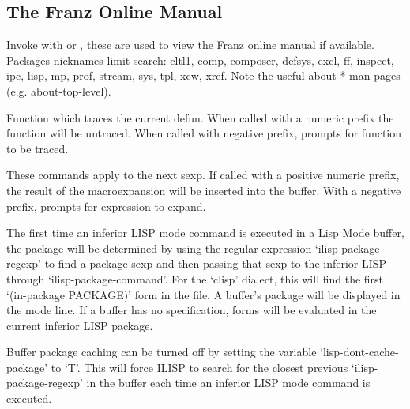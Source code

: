 

\subsection{The Franz Online Manual}

Invoke with  or , these are used to view the
Franz online manual if available.  Packages
nicknames limit search: cltl1, comp, composer, defsys, excl, ff, inspect,
ipc, lisp, mp, prof, stream, sys, tpl, xcw, xref.  Note the useful about-*
man pages (e.g. about-top-level).



Function which traces the current defun. When called with a numeric prefix the
function will be untraced. When called with negative prefix, prompts for function to be traced.



 These commands apply to the next sexp.  If called with a positive
 numeric prefix, the result of the macroexpansion will be inserted
 into the buffer.  With a negative prefix, prompts for expression
 to expand.




The first time an inferior LISP mode command is executed in a Lisp
Mode buffer, the package will be determined by using the regular
expression `ilisp-package-regexp' to find a package sexp and then
passing that sexp to the inferior LISP through `ilisp-package-command'.
For the `clisp' dialect, this will find the first `(in-package
PACKAGE)' form in the file.  A buffer's package will be displayed in
the mode line.  If a buffer has no specification, forms will be
evaluated in the current inferior LISP package.

Buffer package caching can be turned off by setting the variable
`lisp-dont-cache-package' to `T'. This will force ILISP to search for
the closest previous `ilisp-package-regexp' in the buffer each time an
inferior LISP mode command is executed.

